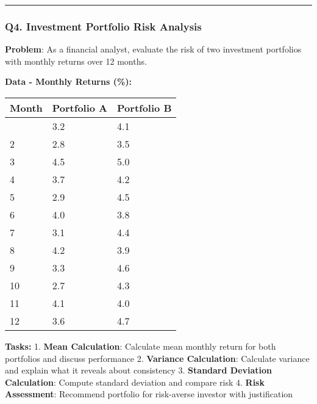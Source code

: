 \documentclass[11pt]{article}
\begin{document}
    \begin{center}\rule{0.5\linewidth}{0.5pt}\end{center}

\subsubsection{Q4. Investment Portfolio Risk
Analysis}\label{q4.-investment-portfolio-risk-analysis}

\textbf{Problem}: As a financial analyst, evaluate the risk of two
investment portfolios with monthly returns over 12 months.

\textbf{Data - Monthly Returns (\%):}

\begin{longtable}[]{@{}lll@{}}
\toprule\noalign{}
Month & Portfolio A & Portfolio B \\
\midrule\noalign{}
\endhead
\bottomrule\noalign{}
\endlastfoot
1 & 3.2 & 4.1 \\
2 & 2.8 & 3.5 \\
3 & 4.5 & 5.0 \\
4 & 3.7 & 4.2 \\
5 & 2.9 & 4.5 \\
6 & 4.0 & 3.8 \\
7 & 3.1 & 4.4 \\
8 & 4.2 & 3.9 \\
9 & 3.3 & 4.6 \\
10 & 2.7 & 4.3 \\
11 & 4.1 & 4.0 \\
12 & 3.6 & 4.7 \\
\end{longtable}

\textbf{Tasks:} 1. \textbf{Mean Calculation}: Calculate mean monthly
return for both portfolios and discuss performance 2. \textbf{Variance
Calculation}: Calculate variance and explain what it reveals about
consistency 3. \textbf{Standard Deviation Calculation}: Compute standard
deviation and compare risk 4. \textbf{Risk Assessment}: Recommend
portfolio for risk-averse investor with justification
\end{document}
